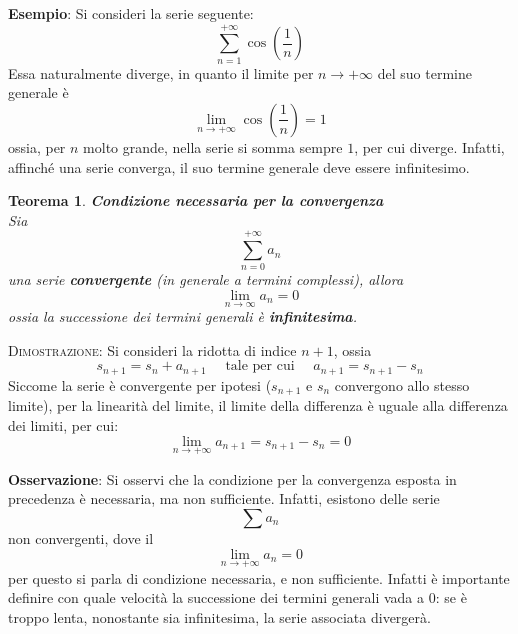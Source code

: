 \documentclass[a4paper]{extarticle}
\newtheorem{theorem}{Teorema}[section]
\begin{document}
\vspace{1em}
\noindent
\textbf{Esempio}: Si consideri la serie seguente:
\[\sum_{n=1}^{+\infty} \cos \left(\frac{1}{n}\right)\]
Essa naturalmente diverge, in quanto il limite per $n \to +\infty$ del suo termine generale è
\[\lim_{n \to +\infty} \cos \left(\frac{1}{n}\right)=1\]
ossia, per $n$ molto grande, nella serie si somma sempre $1$, per cui diverge. Infatti, affinché una serie converga, il suo termine generale deve essere infinitesimo.

\vspace{1em}
\noindent
\begin{theorem} \textbf{Condizione necessaria per la convergenza}\\
    Sia
    \[\sum_{n=0}^{+\infty} a_n\]
    una serie \textbf{convergente} (in generale a termini complessi), allora
    \[\lim_{n \to \infty} a_n=0\]
    ossia la successione dei termini generali è \textbf{infinitesima}.
\end{theorem}

\vspace{2em}
\noindent
\normalfont \normalsize
\textsc{Dimostrazione}: Si consideri la ridotta di indice $n+1$, ossia
\[s_{n+1} = s_n + a_{n+1} \hspace{1em} \text{ tale per cui } \hspace{1em} a_{n+1} = s_{n+1} - s_n\]
Siccome la serie è convergente per ipotesi ($s_{n+1}$ e $s_n$ convergono allo stesso limite), per la linearità del limite, il limite della differenza è uguale alla differenza dei limiti, per cui:
\[\lim_{n \to +\infty} a_{n+1} = s_{n+1} - s_n = 0\]

\vspace{1em}
\noindent
\textbf{Osservazione}: Si osservi che la condizione per la convergenza esposta in precedenza è necessaria, ma non sufficiente. Infatti, esistono delle serie
\[\sum a_n\]
non convergenti, dove il
\[\lim_{n \to +\infty} a_n = 0\]
per questo si parla di condizione necessaria, e non sufficiente. Infatti è importante definire con quale velocità la successione dei termini generali vada a $0$: se è troppo lenta, nonostante sia infinitesima, la serie associata divergerà.

\vspace{1em}
\noindent
\end{document}
